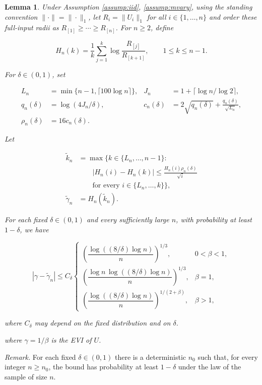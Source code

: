 \documentclass[12pt]{article}
\theoremstyle{plain}
\newtheorem{lemma}[theorem]{Lemma}
\theoremstyle{definition}
\begin{document}
\begin{lemma}
  \label{lemma:mu_rate} Under Assumption \ref{assump:iid}, \ref{assump:mvary}, using the standing convention $\|\cdot\|=\|\cdot\|_1$, let $R_i=\|U_i\|_1$ for all $i\in\{1,\ldots,n\}$ and order these full-input radii as $R_{[1]}\geq\cdots\geq R_{[n]}$. For $n\geq2$, define

\[
H_n(k)=\frac1k\sum_{j=1}^k\log\frac{R_{[j]}}{R_{[k+1]}},\qquad 1\leq k\leq n-1.
\]

For $\delta\in(0,1)$, set

\[
\begin{aligned}
L_n&=\min\{n-1,\lceil100\log n\rceil\},&J_n&=1+\lceil\log n/\log2\rceil,\\
q_n(\delta)&=\log(4J_n/\delta),&c_n(\delta)&=2\sqrt{q_n(\delta)}+\frac{q_n(\delta)}{\sqrt{L_n}},\\
\rho_n(\delta)&=16c_n(\delta).
\end{aligned}
\]

Let

\[
\begin{aligned}
\widetilde k_n&=\max\bigl\{k\in\{L_n,\ldots,n-1\}:\\
&\qquad |H_n(i)-H_n(k)|\leq\frac{H_n(i)\rho_n(\delta)}{\sqrt i}\\
&\qquad \text{for every }i\in\{L_n,\ldots,k\}\bigr\},\\
\widetilde\gamma_n&=H_n(\widetilde k_n).
\end{aligned}
\]

For each fixed $\delta\in(0,1)$ and every sufficiently large $n$, with probability at least $1-\delta$, we have

\[
|\gamma-\widetilde\gamma_n|\leq C_\delta
\begin{cases}
\left(\dfrac{\log((8/\delta)\log n)}{n}\right)^{1/3},&0<\beta<1,\\
\left(\dfrac{\log n\,\log((8/\delta)\log n)}{n}\right)^{1/3},&\beta=1,\\
\left(\dfrac{\log((8/\delta)\log n)}{n}\right)^{1/(2+\beta)},&\beta>1,
\end{cases}
\]

where $C_\delta$ may depend on the fixed distribution and on $\delta$.
  
  where $\gamma = 1 / \beta$ is the EVI of $U$. 
\end{lemma}

\noindent\textit{Remark.} For each fixed $\delta\in(0,1)$ there is a deterministic $n_0$ such that, for every integer $n\geq n_0$, the bound has probability at least $1-\delta$ under the law of the sample of size $n$.
\end{document}
